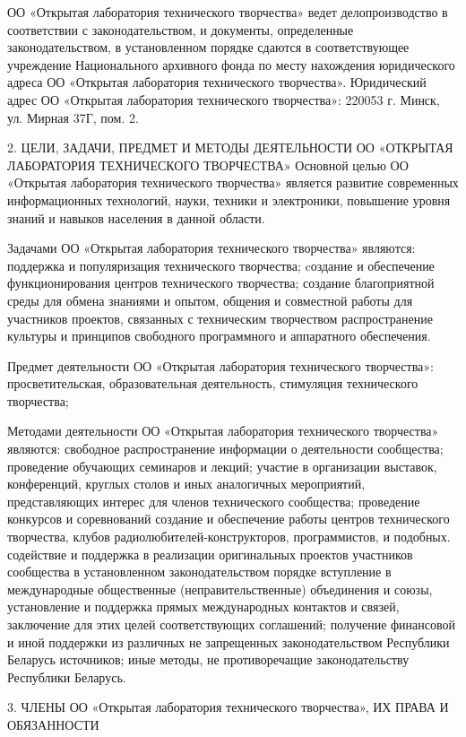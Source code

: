 \documentclass[a4paper,14pt,titlepage]{extarticle}
\begin{document}
ОО «Открытая лаборатория технического творчества» ведет делопроизводство в соответствии с законодательством, и
документы, определенные законодательством, в установленном порядке сдаются в соответствующее учреждение Национального
архивного фонда по месту нахождения юридического адреса ОО «Открытая лаборатория технического творчества».
Юридический адрес ОО «Открытая лаборатория технического творчества»: 220053 г. Минск, ул. Мирная 37Г, пом. 2.

2. ЦЕЛИ, ЗАДАЧИ, ПРЕДМЕТ И МЕТОДЫ ДЕЯТЕЛЬНОСТИ
ОО «ОТКРЫТАЯ ЛАБОРАТОРИЯ ТЕХНИЧЕСКОГО ТВОРЧЕСТВА»
Основной целью ОО «Открытая лаборатория технического творчества» является развитие современных информационных
технологий, науки, техники и электроники, повышение уровня знаний и навыков населения в данной области.

Задачами ОО «Открытая лаборатория технического творчества» являются: 
поддержка и популяризация технического творчества;
 cоздание и обеспечение функционирования центров технического творчества;
создание благоприятной среды для обмена знаниями и опытом, общения и совместной работы для участников проектов,
связанных с техническим творчеством
распространение культуры и принципов свободного программного и аппаратного обеспечения.

Предмет деятельности ОО «Открытая лаборатория технического творчества»: просветительская, образовательная деятельность,
стимуляция технического творчества;

Методами деятельности ОО «Открытая лаборатория технического творчества» являются:
свободное распространение информации о деятельности сообщества;
проведение обучающих семинаров и лекций;
участие в организации выставок, конференций, круглых столов и иных аналогичных мероприятий, представляющих интерес для
членов технического сообщества;
проведение конкурсов и соревнований
создание и обеспечение работы центров технического творчества, клубов радиолюбителей-конструкторов, программистов, и
подобных.
содействие и поддержка в реализации оригинальных проектов участников сообщества
в установленном законодательством порядке вступление в международные общественные (неправительственные) объединения и
союзы, установление и поддержка прямых международных контактов и связей, заключение для этих целей соответствующих
соглашений;
получение финансовой и иной поддержки из различных не запрещенных законодательством Республики Беларусь источников;
иные методы, не противоречащие законодательству Республики Беларусь.

3. ЧЛЕНЫ ОО «Открытая лаборатория технического творчества»,
ИХ ПРАВА И ОБЯЗАННОСТИ
\end{document}
